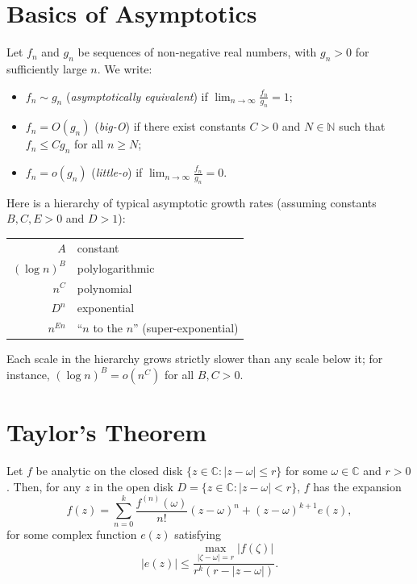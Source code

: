 \section*{Basics of Asymptotics}

\begin{definition}
    Let \(f_n\) and \(g_n\) be sequences of non-negative real numbers, with \(g_n > 0\) for sufficiently large \(n\).
    We write:
    \begin{itemize}
        \item \(f_n \sim g_n\) (\emph{asymptotically equivalent}) if \(\lim_{n\to\infty} \frac{f_n}{g_n} = 1\);
        \item \(f_n = O(g_n)\) (\emph{big-O}) if there exist constants \(C > 0\) and \(N \in \mathbb{N}\) such that \(f_n \le C g_n\) for all \(n \ge N\);
        \item \(f_n = o(g_n)\) (\emph{little-o}) if \(\lim_{n\to\infty} \frac{f_n}{g_n} = 0\).
    \end{itemize}
\end{definition}

Here is a hierarchy of typical asymptotic growth rates (assuming constants \(B, C, E > 0\) and \(D > 1\)):
\begin{center}
    \begin{tabular}{rl}
        \toprule
        \(A\) & constant \\
        \((\log n)^B\) & polylogarithmic \\
        \(n^C\) & polynomial \\
        \(D^n\) & exponential \\
        \(n^{En}\) & ``\(n\) to the \(n\)'' (super-exponential) \\
        \bottomrule
    \end{tabular}
\end{center}
Each scale in the hierarchy grows strictly slower than any scale below it; for instance, \((\log n)^B = o(n^C)\) for all \(B, C > 0\).

\section*{Taylor's Theorem}

\begin{theorem}
    Let \(f\) be analytic on the closed disk \(\{z \in \mathbb{C} : |z - \omega| \le r\}\) for some \(\omega \in \mathbb{C}\) and \(r > 0\).
    Then, for any \(z\) in the open disk \(D = \{z \in \mathbb{C} : |z - \omega| < r\}\), \(f\) has the expansion
    \[
        f(z) = \sum_{n=0}^k \frac{f^{(n)}(\omega)}{n!} (z - \omega)^n + (z - \omega)^{k+1} e(z),
    \]
    for some complex function \(e(z)\) satisfying
    \[
        |e(z)| \le \frac{\max_{|\zeta - \omega| = r} |f(\zeta)|}{r^k(r-|z - \omega|)}.
    \] 
\end{theorem}

